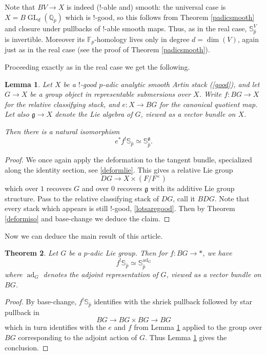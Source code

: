 \documentclass[12pt]{article}
\newtheorem{theorem}{Theorem}[section]
\newtheorem{lemma}[theorem]{Lemma}
\newcommand{\on}{\operatorname}
\newcommand{\mbb}{\mathbb}
\newcommand{\wh}{\widehat}
\begin{document}
Note that $BV \to X$ is indeed ($!$-able and) smooth: the universal case is $X=B\on{GL}_d(\mbb{Q}_p)$ which is $!$-good, so this follows from Theorem \ref{padicsmooth} and closure under pullbacks of $!$-able smooth maps.  Thus, as in the real case, $\mathbb{S}_{\wh{p}}^{V}$ is invertible.  Moreover its $\mathbb{F}_p$-homology lives only in degree $d=\on{dim}(V)$, again just as in the real case (see the proof of Theorem \ref{padicsmooth}).

Proceeding exactly as in the real case we get the following.

\begin{lemma}\label{padiclemma}
Let $X$ be a $!$-good $p$-adic analytic smooth Artin stack (\ref{good}), and let $G\to X$ be a group object in representable submersions over $X$.  Write $f:BG\to X$ for the relative classifying stack, and $e:X\to BG$ for the canonical quotient map.  Let also $\mathfrak{g}\to X$ denote the Lie algebra of $G$, viewed as a vector bundle on $X$.

Then there is a natural isomorphism
$$e^\ast f^!\mbb{S}_{\wh{p}} \simeq \mathbb{S}_{\wh{p}}^{\mathfrak{g}}.$$
\end{lemma}
\begin{proof}
We once again apply the deformation to the tangent bundle, specialized along the identity section, see \ref{deformlie}.  This gives a relative Lie group
$$DG \to X\times (F/F^\times)$$
which over $1$ recovers $G$ and over $0$ recovers $\mathfrak{g}$ with its additive Lie group structure.  Pass to the relative classifying stack of $DG$, call it $BDG$.  Note that every stack which appears is still $!$-good, \ref{lotsaregood}.  Then by Theorem \ref{deformiso} and base-change we deduce the claim.
\end{proof}

Now we can deduce the main result of this article.

\begin{theorem}\label{maintheorem}
Let $G$ be a $p$-adic Lie group.  Then for $f:BG\to \ast$, we have
$$f^!\mbb{S}_{\wh{p}} \simeq \mbb{S}_{\wh{p}}^{\on{ad}_G}$$
where $\on{ad}_G$ denotes the adjoint representation of $G$, viewed as a vector bundle on $BG$.
\end{theorem}
\begin{proof}
By base-change, $f^!\mbb{S}_{\wh{p}}$ identifies with the shriek pullback followed by star pullback in
$$BG \to BG \times BG \to BG$$
which in turn identifies with the $e$ and $f$ from Lemma \ref{padiclemma} applied to the group over $BG$ corresponding to the adjoint action of $G$.  Thus Lemma \ref{padiclemma} gives the conclusion.
\end{proof}
\end{document}

